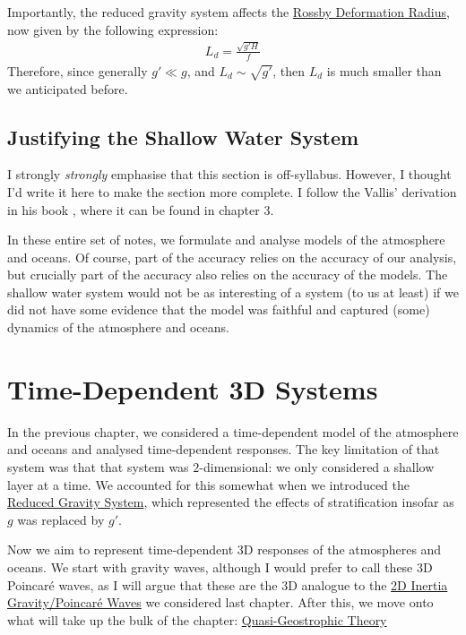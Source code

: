 Importantly, the reduced gravity system affects the \hyperref[SW Def Radius Box]{Rossby Deformation Radius}, now given by the following expression:
\begin{align*}
    L_d = \frac{\sqrt{g' H}}{f}
\end{align*}
Therefore, since generally $g'\ll g$, and $L_d\sim\sqrt{g'}$, then $L_d$ is much smaller than we anticipated before.

\section{Justifying the Shallow Water System}\label{SW Justification}

I strongly \textit{strongly} emphasise that this section is off-syllabus. However, I thought I'd write it here to make the section more complete. I follow the Vallis' derivation in his book \cite{Vallis}, where it can be found in chapter 3.

In these entire set of notes, we formulate and analyse models of the atmosphere and oceans. Of course, part of the accuracy relies on the accuracy of our analysis, but crucially part of the accuracy also relies on the accuracy of the models. The shallow water system would not be as interesting of a system (to us at least) if we did not have some evidence that the model was faithful and captured (some) dynamics of the atmosphere and oceans.


\chapter{Time-Dependent 3D Systems}\label{3D Systems}

In the previous chapter, we considered a time-dependent model of the atmosphere and oceans and analysed time-dependent responses. The key limitation of that system was that that system was $2$-dimensional: we only considered a shallow layer at a time. We accounted for this somewhat when we introduced the \hyperref[RG Box]{Reduced Gravity System}, which represented the effects of stratification insofar as $g$ was replaced by $g'$. 

Now we aim to represent time-dependent 3D responses of the atmospheres and oceans. We start with gravity waves, although I would prefer to call these 3D Poincaré waves, as I will argue that these are the 3D analogue to the \hyperref[2D Poincare]{2D Inertia Gravity/Poincaré Waves} we considered last chapter. After this, we move onto what will take up the bulk of the chapter: \hyperref[QG]{Quasi-Geostrophic Theory}

